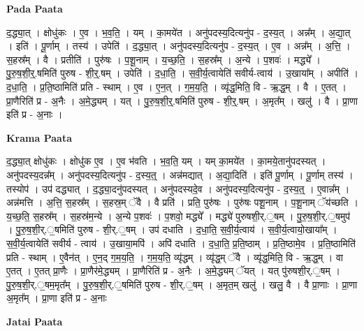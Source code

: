 \documentclass[17pt]{extarticle}
\begin{document}
\textbf{Pada Paata} \newline

द॒द्ध्या॒त् । क्षोधु॑कः । ए॒व । भ॒व॒ति॒ । यम् । का॒मये॑त । अनु॑पदस्य॒दित्यनु॑प - द॒स्य॒त् । अन्न᳚म् । अ॒द्या॒त् । इति॑ । पू॒र्णाम् । तस्य॑ । उपेति॑ । द॒द्ध्या॒त् । अनु॑पदस्य॒दित्यनु॑प - द॒स्य॒त् । ए॒व । अन्न᳚म् । अ॒त्ति॒ । स॒हस्र᳚म् । वै । प्रतीति॑ । पुरु॑षः । प॒शू॒नाम् । य॒च्छ॒ति॒ । स॒हस्र᳚म् । अ॒न्ये । प॒शवः॑ । मद्ध्ये᳚ । पु॒रु॒ष॒शी॒र्॒.षमिति॑ पुरुष - शी॒र्॒.षम् । उपेति॑ । द॒धा॒ति॒ । स॒वी॒र्य॒त्वायेति॑ सवीर्य-त्वाय॑ । उ॒खाया᳚म् । अपीति॑ । द॒धा॒ति॒ । प्र॒ति॒ष्ठामिति॑ प्रति - स्थाम् । ए॒व । ए॒न॒त् । ग॒म॒य॒ति॒ । व्यृ॑द्ध॒मिति॒ वि - ऋ॒द्ध॒म् । वै । ए॒तत् । प्रा॒णैरिति॑ प्र - अ॒नैः । अ॒मे॒द्ध्यम् । यत् । पु॒रु॒ष॒शी॒र्॒.षमिति॑ पुरुष - शी॒र्॒.षम् । अ॒मृत᳚म् । खलु॑ । वै । प्रा॒णा इति॑ प्र - अ॒नाः ।  \newline


\textbf{Krama Paata} \newline

द॒द्ध्या॒त् क्षोधु॑कः । क्षोधु॑क ए॒व । ए॒व भ॑वति । भ॒व॒ति॒ यम् । यम् का॒मये॑त । का॒मये॒तानु॑पदस्यत् । अनु॑पदस्य॒दन्न᳚म् । अनु॑पदस्य॒दित्यनु॑प - द॒स्य॒त्॒ । अन्न॑मद्यात् । अ॒द्या॒दिति॑ । इति॑ पू॒र्णाम् । पू॒र्णाम् तस्य॑ । तस्योप॑ । उप॑ दद्ध्यात् । द॒द्ध्या॒दनु॑पदस्यत् । अनु॑पदस्यदे॒व । अनु॑पदस्य॒दित्यनु॑प - द॒स्य॒त्॒ । ए॒वान्न᳚म् । अन्न॑मत्ति । अ॒त्ति॒ स॒हस्र᳚म् । स॒हस्र॒म् ॅवै । वै प्रति॑ । प्रति॒ पुरु॑षः । पुरु॑षः पशू॒नाम् । प॒शू॒नाम् ॅय॑च्छति । य॒च्छ॒ति॒ स॒हस्र᳚म् । स॒हस्र॑म॒न्ये । अ॒न्ये प॒शवः॑ । प॒शवो॒ मद्ध्ये᳚ । मद्ध्ये॑ पुरुषशी॒र्.॒षम् । पु॒रु॒ष॒शी॒र्.॒षमुप॑ । पु॒रु॒ष॒शी॒र्.॒षमिति॑ पुरुष - शी॒र्.॒षम् । उप॑ दधाति । द॒धा॒ति॒ स॒वी॒र्य॒त्वाय॑ । स॒वी॒र्य॒त्वायो॒खाया᳚म् । स॒वी॒र्य॒त्वायेति॑ सवीर्य - त्वाय॑ । उ॒खाया॒मपि॑ । अपि॑ दधाति । द॒धा॒ति॒ प्र॒ति॒ष्ठाम् । प्र॒ति॒ष्ठामे॒व । प्र॒ति॒ष्ठामिति॑ प्रति - स्थाम् । ए॒वैन॑त् । ए॒न॒द् ग॒म॒य॒ति॒ । ग॒म॒य॒ति॒ व्यृ॑द्धम् । व्यृ॑द्ध॒म् ॅवै । व्यृ॑द्ध॒मिति॒ वि - ऋ॒द्ध॒म् । वा ए॒तत् । ए॒तत् प्रा॒णैः । प्रा॒णैर॑मे॒द्ध्यम् । प्रा॒णैरिति॑ प्र - अ॒नैः । अ॒मे॒द्ध्यम् ॅयत् । यत् पु॑रुषशी॒र्.॒षम् । पु॒रु॒ष॒शी॒र्.॒षम॒मृत᳚म् । पु॒रु॒ष॒शी॒र्.॒षमिति॑ पुरुष - शी॒र्.॒षम् । अ॒मृत॒म् खलु॑ । खलु॒ वै । वै प्रा॒णाः । प्रा॒णा अ॒मृत᳚म् । प्रा॒णा इति॑ प्र - अ॒नाः \newline

\textbf{Jatai Paata} \newline
\end{document}
